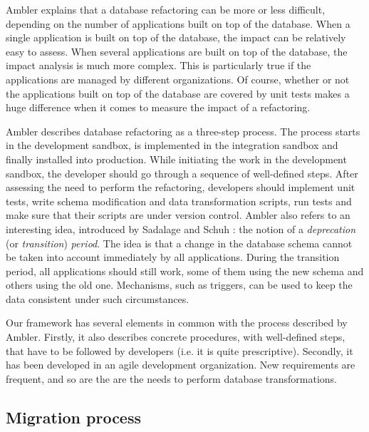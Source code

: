 Ambler explains that a database refactoring can be more or less difficult, depending on the number of applications built on top of the database. When a single application is built on top of the database, the impact can be relatively easy to assess. When several applications are built on top of the database, the impact analysis is much more complex. This is particularly true if the applications are managed by different organizations. Of course, whether or not the applications built on top of the database are covered by unit tests makes a huge difference when it comes to measure the impact of a refactoring.

Ambler describes database refactoring as a three-step process. The process starts in the development sandbox, is implemented in the integration sandbox and finally installed into production. While initiating the work in the development sandbox, the developer should go through a sequence of well-defined steps. After assessing the need to perform the refactoring, developers should implement unit tests, write schema modification and data transformation scripts, run tests and make sure that their scripts are under version control. Ambler also refers to an interesting idea, introduced by Sadalage and Schuh \cite{sadalage_agile_database}: the notion of a \emph{deprecation} (or \emph{transition}) \emph{period}. The idea is that a change in the database schema cannot be taken into account immediately by all applications. During the transition period, all applications should still work, some of them using the new schema and others using the old one. Mechanisms, such as triggers, can be used to keep the data consistent under such circumstances.

Our framework has several elements in common with the process described by Ambler. Firstly, it also describes concrete procedures, with well-defined steps, that have to be followed by developers (i.e. it is quite prescriptive). Secondly, it has been developed in an agile development organization. New requirements are frequent, and so are the are the needs to perform database transformations.

\subsection{Migration process}

